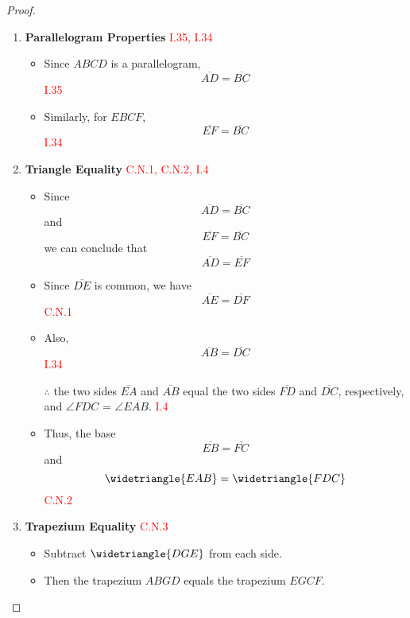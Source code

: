 \begin{proof}

\begin{enumerate}
    \item \textbf{Parallelogram Properties} \hfill\textcolor{red}{I.35, I.34}
    \begin{itemize}
        \item Since $ABCD$ is a parallelogram, 
        \[\overline{AD} = \overline{BC}\] \hfill\textcolor{red}{I.35}
        
        \item Similarly, for $EBCF$, 
        \[\overline{EF} = \overline{BC}\] \hfill\textcolor{red}{I.34}
    \end{itemize}

    \item \textbf{Triangle Equality} \hfill\textcolor{red}{C.N.1, C.N.2, I.4}
    \begin{itemize}
        \item Since 
        \[\overline{AD} = \overline{BC}\] 
        and 
        \[\overline{EF} = \overline{BC}\] 
        we can conclude that 
        \[\overline{AD} = \overline{EF}\]
        
        \item Since $\overline{DE}$ is common, we have 
        \[\overline{AE} = \overline{DF}\]\hfill\textcolor{red}{C.N.1}
        
        \item Also, 
        \[\overline{AB} = \overline{DC}\]\hfill\textcolor{red}{I.34}
        
        \item[$\therefore$] the two sides $\overline{EA}$ and $\overline{AB}$ equal the two sides $\overline{FD}$ and $\overline{DC}$, respectively, and $\angle{FDC}$ = $\angle{EAB}$. \hfill\textcolor{red}{I.4}
        
        \item Thus, the base 
        \[\overline{EB} =\overline{FC}\] 
        and 
        \[\widetriangle{EAB} = \widetriangle{FDC}\]\hfill\textcolor{red}{C.N.2}
    \end{itemize}

    \item \textbf{Trapezium Equality} \hfill\textcolor{red}{C.N.3}
    \begin{itemize}
        \item Subtract $\widetriangle{DGE}$ from each side.
        \item Then the trapezium $ABGD$ equals the trapezium $EGCF$.
    \end{itemize}


\end{enumerate}
\end{proof}
